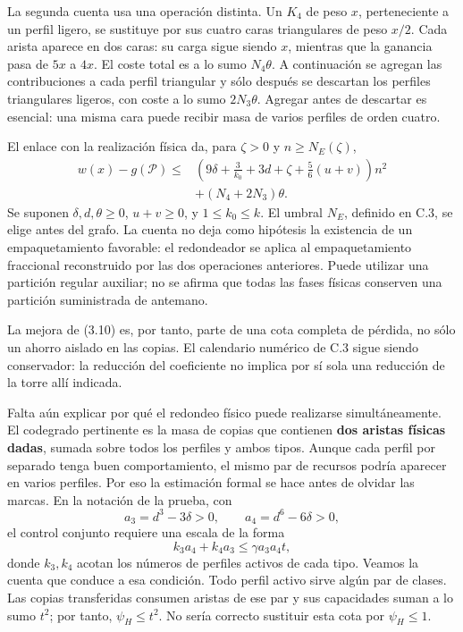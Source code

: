 \documentclass[spanish,11pt,a4paper]{article}
\begin{document}
La segunda cuenta usa una operación distinta. Un \(K_4\) de peso \(x\), perteneciente a un perfil ligero, se sustituye por sus cuatro caras triangulares de peso \(x/2\). Cada arista aparece en dos caras: su carga sigue siendo \(x\), mientras que la ganancia pasa de \(5x\) a \(4x\). El coste total es a lo sumo \(N_4\theta\). A continuación se agregan las contribuciones a cada perfil triangular y sólo después se descartan los perfiles triangulares ligeros, con coste a lo sumo \(2N_3\theta\). Agregar antes de descartar es esencial: una misma cara puede recibir masa de varios perfiles de orden cuatro.

El enlace con la realización física da, para \(\zeta>0\) y \(n\ge N_E(\zeta)\), \[
\begin{aligned}
w(x)-g(\mathcal P)\le{}&
\left(9\delta+\frac3{k_0}+3d+\zeta
             +\frac56(u+v)\right)n^2\\
&+(N_4+2N_3)\theta .
\end{aligned}
\tag{3.11}
\] Se suponen \(\delta,d,\theta\ge0\), \(u+v\ge0\), y \(1\le k_0\le k\). El umbral \(N_E\), definido en C.3, se elige antes del grafo. La cuenta no deja como hipótesis la existencia de un empaquetamiento favorable: el redondeador se aplica al empaquetamiento fraccional reconstruido por las dos operaciones anteriores. Puede utilizar una partición regular auxiliar; no se afirma que todas las fases físicas conserven una partición suministrada de antemano.

La mejora de (3.10) es, por tanto, parte de una cota completa de pérdida, no sólo un ahorro aislado en las copias. El calendario numérico de C.3 sigue siendo conservador: la reducción del coeficiente no implica por sí sola una reducción de la torre allí indicada.

Falta aún explicar por qué el redondeo físico puede realizarse simultáneamente. El codegrado pertinente es la masa de copias que contienen \textbf{dos aristas físicas dadas}, sumada sobre todos los perfiles y ambos tipos. Aunque cada perfil por separado tenga buen comportamiento, el mismo par de recursos podría aparecer en varios perfiles. Por eso la estimación formal se hace antes de olvidar las marcas. En la notación de la prueba, con \[
a_3=d^3-3\delta>0,\qquad a_4=d^6-6\delta>0,
\] el control conjunto requiere una escala de la forma \[
k_3a_4+k_4a_3\le\gamma a_3a_4t,
\tag{3.12}
\] donde \(k_3,k_4\) acotan los números de perfiles activos de cada tipo. Veamos la cuenta que conduce a esa condición. Todo perfil activo sirve algún par de clases. Las copias transferidas consumen aristas de ese par y sus capacidades suman a lo sumo \(t^2\); por tanto, \(\psi_H\le t^2\). No sería correcto sustituir esta cota por \(\psi_H\le1\).
\end{document}
